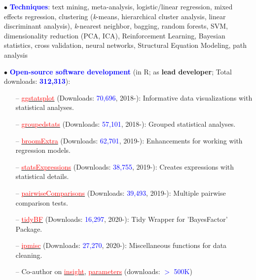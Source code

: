 \documentclass[10pt]{article}
\begin{document}
	$\bullet$ \textcolor{blue}{\textbf{Techniques}}: text mining, meta-analysis, logistic/linear regression, mixed effects regression, clustering \hspace*{0.1in}(\textit{k}-means, hierarchical cluster analysis, linear discriminant analysis), \textit{k}-nearest neighbor, bagging, random \hspace*{0.1in}forests, SVM, dimensionality reduction (PCA, ICA), Reinforcement Learning, Bayesian statistics, cross \hspace*{0.1in}validation, neural networks, Structural Equation Modeling, path analysis
	\miniskip
	
	$\bullet$ \textcolor{blue}{\textbf{Open-source software development}} (in R; as \textbf{lead developer}; Total downloads: \textcolor{blue}{\textbf{312,313}}):
	 \vspace*{-0.09in}
	 
	\begin{itemize}
	\itemsep-0.1em
	\item[--] \href{https://indrajeetpatil.github.io/ggstatsplot/}{\textcolor{red}{ggstatsplot}} (Downloads: \textcolor{blue}{70,696}, 2018-): Informative data visualizations with statistical analyses.
	\item[--] \href{https://indrajeetpatil.github.io/groupedstats/}{\textcolor{red}{groupedstats}} (Downloads: \textcolor{blue}{57,101}, 2018-): Grouped statistical analyses.
	\item[--] \href{https://indrajeetpatil.github.io/groupedstats/}{\textcolor{red}{broomExtra}} (Downloads: \textcolor{blue}{62,701}, 2019-): Enhancements for working with regression models.
	\item[--] \href{https://indrajeetpatil.github.io/statsExpressions/}{\textcolor{red}{statsExpressions}} (Downloads: \textcolor{blue}{38,755}, 2019-): Creates expressions with statistical details.
	\item[--] \href{https://indrajeetpatil.github.io/pairwiseComparisons/}{\textcolor{red}{pairwiseComparisons}} (Downloads: \textcolor{blue}{39,493}, 2019-): Multiple pairwise comparison tests.
    \item[--] \href{https://indrajeetpatil.github.io/tidyBF/}{\textcolor{red}{tidyBF}} (Downloads: \textcolor{blue}{16,297}, 2020-): Tidy Wrapper for 'BayesFactor' Package.
	\item[--] \href{https://indrajeetpatil.github.io/ipmisc/}{\textcolor{red}{ipmisc}} (Downloads: \textcolor{blue}{27,270}, 2020-): Miscellaneous functions for data cleaning.	
	\item[--] Co-author on \href{https://easystats.github.io/insight/}{\textcolor{red}{insight}}, \href{https://easystats.github.io/parameters/}{\textcolor{red}{parameters}} (downloads: \textcolor{blue}{$>$ 500K})
	\end{itemize}
\end{document}
